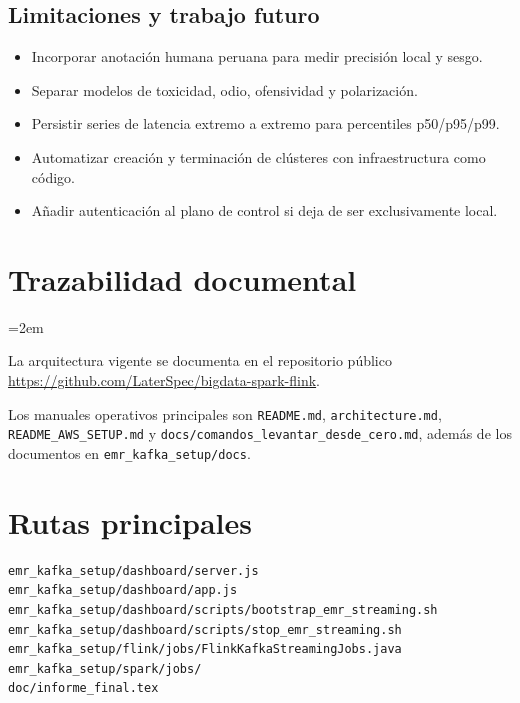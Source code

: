 \documentclass[11pt,a4paper,openany]{report}
\newcommand{\topic}[1]{\texttt{#1}}
\begin{document}
\section*{Limitaciones y trabajo futuro}

\begin{itemize}
  \item Incorporar anotación humana peruana para medir precisión local y sesgo.
  \item Separar modelos de toxicidad, odio, ofensividad y polarización.
  \item Persistir series de latencia extremo a extremo para percentiles p50/p95/p99.
  \item Automatizar creación y terminación de clústeres con infraestructura como código.
  \item Añadir autenticación al plano de control si deja de ser exclusivamente local.
\end{itemize}

\appendix
\chapter{Trazabilidad documental}

\begingroup\sloppy\emergencystretch=2em

La arquitectura vigente se documenta en el repositorio público
\url{https://github.com/LaterSpec/bigdata-spark-flink}.

Los manuales operativos principales son \topic{README.md}, \topic{architecture.md}, \topic{README\_AWS\_SETUP.md} y \topic{docs/comandos\_levantar\_desde\_cero.md}, además de los documentos en \topic{emr\_kafka\_setup/docs}.

\endgroup

\chapter{Rutas principales}

\begin{lstlisting}
emr_kafka_setup/dashboard/server.js
emr_kafka_setup/dashboard/app.js
emr_kafka_setup/dashboard/scripts/bootstrap_emr_streaming.sh
emr_kafka_setup/dashboard/scripts/stop_emr_streaming.sh
emr_kafka_setup/flink/jobs/FlinkKafkaStreamingJobs.java
emr_kafka_setup/spark/jobs/
doc/informe_final.tex
\end{lstlisting}
\end{document}
